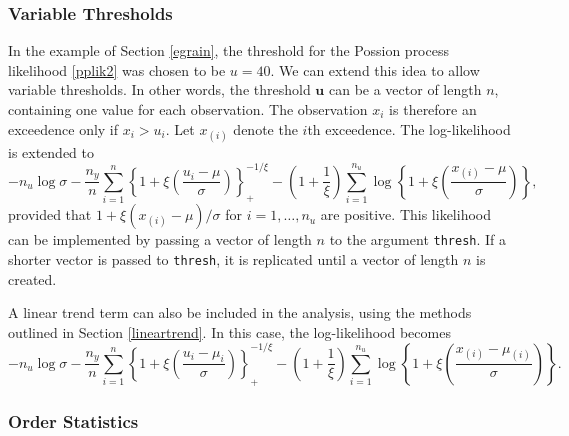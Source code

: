 \documentclass[11pt,a4paper]{article}
\newcommand{\bs}{\boldsymbol}
\begin{document}
\subsubsection{Variable Thresholds}
\label{variablethresh}

In the example of Section \ref{egrain}, the threshold for the Possion process likelihood \eqref{pplik2} was chosen to be $u=40$.
We can extend this idea to allow variable thresholds.
In other words, the threshold $\bs{u}$ can be a vector of length $n$, containing one value for each observation.
The observation $x_i$ is therefore an exceedence only if $x_i > u_i$. 
Let $x_{(i)}$ denote the $i$th exceedence.
The log-likelihood is extended to
\begin{equation*}
-n_u\log \sigma - \frac{n_y}{n} \sum_{i=1}^{n} \left\{1 + \xi\left(\frac{u_{i}-\mu}{\sigma}\right)\right\}_{+}^{-1/\xi} - \left(1+\frac{1}{\xi}\right) \sum_{i=1}^{n_u} \log\left\{1 + \xi\left(\frac{x_{(i)}-\mu}{\sigma}\right)\right\},
\end{equation*}
provided that $1 + \xi(x_{(i)}-\mu)/\sigma$ for $i=1,\dots,n_u$ are positive.
This likelihood can be implemented by passing a vector of length $n$ to the argument \verb+thresh+. 
If a shorter vector is passed to \verb+thresh+, it is replicated until a vector of length $n$ is created.

A linear trend term can also be included in the analysis, using the methods outlined in Section \ref{lineartrend}.
In this case, the log-likelihood becomes
\begin{equation*}
-n_u\log \sigma - \frac{n_y}{n} \sum_{i=1}^{n} \left\{1 + \xi\left(\frac{u_{i}-\mu_{i}}{\sigma}\right)\right\}_{+}^{-1/\xi} - \left(1+\frac{1}{\xi}\right) \sum_{i=1}^{n_u} \log\left\{1 + \xi\left(\frac{x_{(i)}-\mu_{(i)}}{\sigma}\right)\right\}.
\end{equation*}

\subsubsection{Order Statistics}
\label{orderstats}
\end{document}
